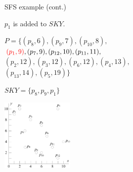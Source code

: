 \documentclass{beamer}
\def\vgap{\vspace{5mm}}
\newcommand{\red}[1]{\textcolor{red}{#1}}
\begin{document}
    \begin{frame}{SFS example (cont.)}
    \begin{small} \label{fra:sfs-sort}
		$p_1$ is added to $SKY$.

		\vgap

        \begin{minipage}[b]{0.5\linewidth}
            $P = \{(p_8, 6), (p_9, 7), (p_{10}, 8),$ \\
            $\red{(p_1, 9)}, (p_7, 9), (p_{12}, 10), (p_{11}, 11),$ \\
            $(p_2, 12), (p_3, 12), (p_6, 12), (p_4, 13),$ \\
            $(p_{13}, 14), (p_5, 19)\}$ \vspace{10mm}

			$SKY = \{p_8, p_9, p_1\}$
        \end{minipage}
        \begin{minipage}[b]{0.45\linewidth}
            \begin{center}
                \includegraphics[height=35mm]{./artwork/data.pdf}
            \end{center}
        \end{minipage}
    \end{small}
    \end{frame}
\end{document}
